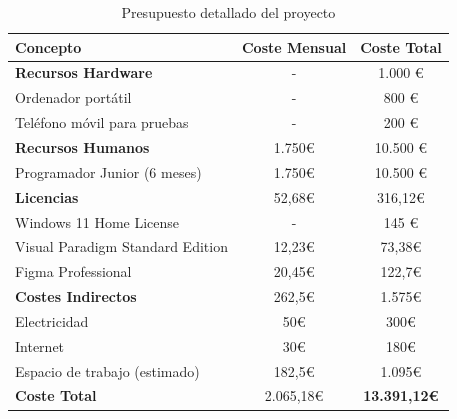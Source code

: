 \begin{table}[H]
    \centering
    \begin{tabular}{|l|c|c|}
        \hline
        \rowcolor[HTML]{C0C0C0} 
        \textbf{Concepto} & \textbf{Coste Mensual} & \textbf{Coste Total} \\ \hline
        \textbf{Recursos Hardware} & - & 1.000 \euro \\ \hline
        Ordenador portátil & - & 800 \euro \\ \hline
        Teléfono móvil para pruebas & - & 200 \euro \\ \hline
        \textbf{Recursos Humanos} & 1.750\euro & 10.500 \euro \\ \hline
        Programador Junior (6 meses) & 1.750\euro & 10.500 \euro \\ \hline
        \textbf{Licencias} & 52,68\euro & 316,12\euro \\ \hline
        Windows 11 Home License & - & 145 \euro \\ \hline
        Visual Paradigm Standard Edition & 12,23\euro & 73,38\euro \\ \hline
        Figma Professional & 20,45\euro & 122,7\euro \\ \hline
        \textbf{Costes Indirectos} & 262,5\euro & 1.575\euro \\ \hline
        Electricidad & 50\euro & 300\euro \\ \hline
        Internet & 30\euro & 180\euro \\ \hline
        Espacio de trabajo (estimado) & 182,5\euro & 1.095\euro \\ \hline
        \textbf{Coste Total} & 2.065,18\euro & \textbf{13.391,12\euro} \\ \hline
    \end{tabular}
    \caption{Presupuesto detallado del proyecto}
    \label{tab:presupuesto_detallado}
\end{table}




\newpage